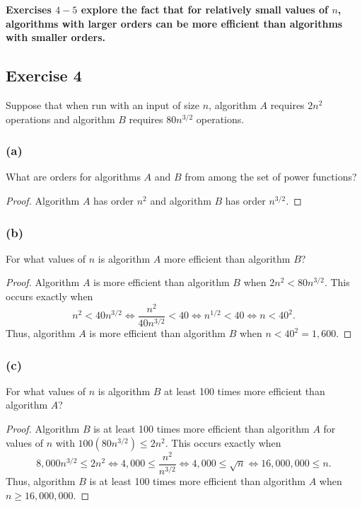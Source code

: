 \documentclass[14pt]{extarticle}
\newcommand{\cy}{\color{cyan}}
\begin{document}
{\bf \cy Exercises \(4-5\) explore the fact that for relatively small values of \(n\), algorithms with larger 
orders can be more efficient than algorithms with smaller orders.}

\subsection{Exercise 4}
Suppose that when run with an input of size \(n\), algorithm \(A\) requires \(2n^2\) operations and algorithm \(B\) requires 
\(80n^{3/2}\) operations.

\subsubsection{(a)}
What are orders for algorithms \(A\) and \(B\) from among the set of power functions?

\begin{proof}
Algorithm \(A\) has order \(n^2\) and algorithm \(B\) has order \(n^{3/2}\).
\end{proof}

\subsubsection{(b)}
For what values of \(n\) is algorithm \(A\) more efficient than algorithm \(B\)?

\begin{proof}
Algorithm \(A\) is more efficient than algorithm \(B\) when \(2n^2 < 80n^{3/2}\). This occurs exactly when
\[
n^2 < 40n^{3/2} \iff \frac{n^2}{40n^{3/2}} < 40 \iff n^{1/2} < 40 \iff n < 40^2.
\]
Thus, algorithm \(A\) is more efficient than algorithm \(B\) when \(n < 40^2 = 1,600\).
\end{proof}

\subsubsection{(c)}
For what values of \(n\) is algorithm \(B\) at least 100 times more efficient than algorithm \(A\)?

\begin{proof}
Algorithm \(B\) is at least 100 times more efficient than algorithm \(A\) for values of \(n\) with \(100(80n^{3/2}) \leq 
2n^2\). This occurs exactly when 
\[
8,000n^{3/2} \leq 2n^2 \iff 4,000 \leq \frac{n^2}{n^{3/2}} \iff 4,000 \leq \sqrt{n} \iff 16,000,000 \leq n. 
\]
Thus, algorithm \(B\) is at least 100 times more efficient than algorithm \(A\) when \(n \geq 16,000,000\).
\end{proof}
\end{document}
